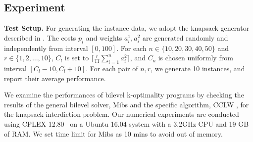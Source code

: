 \documentclass[11pt]{article}
\begin{document}
\subsection{Experiment}
%			
%			
%			
%

\noindent \textbf{Test Setup.} For generating the instance data, we adopt the knapsack generator described in \cite{martello1999dynamic,caprara2016bilevel}. The costs $p_i$ and weights $a^1_i, a^2_i$ are generated randomly and independently from interval $[0, 100]$. For each $n \in \{10, 20, 30, 40, 50\}$ and $r \in \{1,2,\ldots, 10\}$, $C_l$ is set to $\lceil \frac{r}{11} \sum_{i=1}^{n} a_i^2 \rceil$, and $C_u$ is chosen uniformly from interval $[C_l -10, C_l+10]$. For each pair of $n, r$, we generate 10 instances, and report their average performance.

We examine the performances of bilevel k-optimality programs by checking the results of the general bilevel solver, Mibs \cite{tahernejad2016branch} and the specific algorithm, CCLW \cite{caprara2016bilevel}, for the knapsack interdiction problem. Our numerical experiments are conducted using CPLEX 12.80~\cite{ilog2017cplex} on a Ubuntu 16.04 system with a 3.2GHz CPU and 19 GB of RAM. We set time limit for Mibs as 10 mins to avoid out of memory.
 
\end{document}
